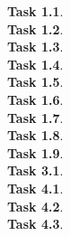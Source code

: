 \documentclass[11pt]{article}
\newcommand{\task}[1]{\clearpage\textbf{Task #1}. \\[0.5em]}
\newcommand{\eeq}{\ensuremath{\cong}}
\newcommand{\code}[2][]{{\sloppy
\ifmmode
    \text{\lstinline[language=sml,style=15150code,#1]`#2`}
\else
    {\lstinline[language=sml,style=15150code,#1]`#2`}%
\fi}}
\newcommand{\codefile}[2][]{}
\begin{document}





\task{1.1}

\task{1.2}

\task{1.3}

\task{1.4}

\task{1.5}

\task{1.6}

\task{1.7}

\task{1.8}

\task{1.9}

\task{3.1}

\task{4.1}

\task{4.2}

\task{4.3}
\end{document}
